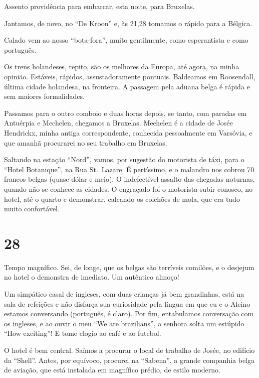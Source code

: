 Assento providência para embarcar, esta noite, para Bruxelas.

Jantamos, de novo, no ``De Kroon'' e, às 21,28 tomamos o rápido para a Bélgica.

Calado vem ao nosso ``bota-fora'', muito gentilmente, como esperantista e como português.

Os trens holandeses, repito, são os melhores da Europa, até agora, na minha opinião. Estáveis, rápidos, assustadoramente pontuais. Baldeamos em Roosendall, última cidade holandesa, na fronteira. A passagem pela aduana belga é rápida e sem maiores formalidades.

Passamos para o outro comboio e duas horas depois, se tanto, com paradas em Antuérpia e Mechelen, chegamos a Bruxelas. Mechelen é a cidade de Josée Hendrickx, minha antiga correspondente, conhecida pessoalmente em Varsóvia, e que amanhã procurarei no seu trabalho em Bruxelas.

Saltando na estação ``Nord'', vamos, por sugestão do motorista de táxi, para o ``Hotel Botanique'', na Rua St.~Lazare. É pertíssimo, e o malandro nos cobrou 70 francos belgas (quase dólar e meio). O indefectível assalto das chegadas noturnas, quando não se conhece as cidades. O engraçado foi o motorista subir conosco, no hotel, até o quarto e demonstrar, calcando os colchões de mola, que era tudo muito confortável.

\section*{28 \adfflatleafright {}}
Tempo magnífico. Sei, de longe, que os belgas são terríveis comilões, e o desjejum no hotel o demonstra de imediato. Um autêntico almoço!

Um simpático casal de ingleses, com duas crianças já bem grandinhas, está na sala de refeições e não disfarça sua curiosidade pela língua em que eu e o Alcino estamos conversando (português, é claro). Por fim, entabulamos conversação com os ingleses, e ao ouvir o meu ``We are brazilians'', a senhora solta um estúpido ``How exciting''! E tome elogio ao café e ao futebol.

O hotel é bem central. Saímos a procurar o local de trabalho de Josée, no edifício da ``Shell''. Antes, por equívoco, procurei na ``Sabena'', a grande companhia belga de aviação, que está instalada em magnífico prédio, de estilo moderno.

